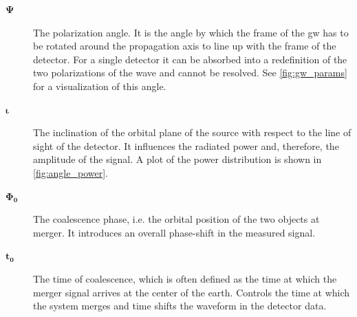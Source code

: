 \begin{description}
	\item[$\bm{\Psi}$] The polarization angle. It is the angle by which the frame of the \acrshort{gw} has to be rotated around the propagation axis to line up with the frame of the detector. For a single detector it can be absorbed into a redefinition of the two polarizations of the wave and cannot be resolved. See \autoref{fig:gw_params} for a visualization of this angle.
	\item[$\bm{\iota}$] The inclination of the orbital plane of the source with respect to the line of sight of the detector. It influences the radiated power and, therefore, the amplitude of the signal. A plot of the power distribution is shown in \autoref{fig:angle_power}.
	\item[$\bm{\Phi_0}$] The coalescence phase, i.e. the orbital position of the two objects at merger. It introduces an overall phase-shift in the measured signal.
	\item[$\bm{t_0}$] The time of coalescence, which is often defined as the time at which the merger signal arrives at the center of the earth. Controls the time at which the system merges and time shifts the waveform in the detector data.
\end{description}

